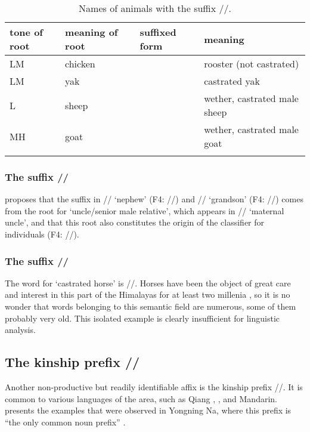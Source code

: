 	\begin{table}%
		\caption{\label{tab:namesofanimalswiththesuffix}Names of animals with the suffix //.}
		\begin{tabularx}{\textwidth}{ Q l l l }
			\lsptoprule
			tone of root & meaning of root & suffixed form & meaning\\ \midrule
			LM & chicken &  & rooster (not castrated)\\
			LM & yak &  & castrated yak\\
			L & sheep &  & wether, castrated male sheep\\
			MH & goat &  & wether, castrated male goat\\
			\lspbottomrule
		\end{tabularx}
	\end{table}

		\subsubsection{The suffix //}
		\label{sec:thesuffixv}
	\largerpage[-2]
	\citet[179]{lidz2010} proposes that the suffix in // ‘nephew' (F4: //) and // ‘grandson' (F4: //) comes from the root for ‘uncle/senior male
	relative’, which appears in // ‘maternal uncle', and that this root also constitutes the origin of the classifier for individuals (F4: //).
	
		\subsubsection{The suffix //}
		\label{sec:thesuffixro}
	\largerpage[-1]

	The word for ‘castrated horse’ is //. Horses have been the object of great care and interest in this part of the Himalayas for at least two millenia \citep{wang1980}, so it is no wonder that words belonging to this semantic field are numerous, some of them probably very old. This isolated example is clearly insufficient for linguistic analysis.
	

	\subsection{The kinship prefix //}
	\label{sec:thekinshipprefix}
	
	Another non-productive but readily identifiable {affix} is the kinship prefix //. It is common to various languages of the area, such as Qiang
	\citep[158–159]{evansetal2007}, , and {Mandarin}.  presents the examples that were observed in
	Yongning Na, where this prefix is “the only common noun prefix” \citep[167]{lidz2010}.
	

